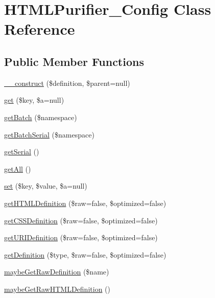 \hypertarget{classHTMLPurifier__Config}{\section{H\+T\+M\+L\+Purifier\+\_\+\+Config Class Reference}
\label{classHTMLPurifier__Config}
}
\subsection*{Public Member Functions}
\begin{DoxyCompactItemize}
\item 
\hyperlink{classHTMLPurifier__Config_aa44fad3c8858c98b59c1051bb9d3481a}{\+\_\+\+\_\+construct} (\$definition, \$parent=null)
\item 
\hyperlink{classHTMLPurifier__Config_ab94944fe3daf78d8acb100617073d0d7}{get} (\$key, \$a=null)
\item 
\hyperlink{classHTMLPurifier__Config_a5af7e5ab7e960f78f6fffb14c86cce9a}{get\+Batch} (\$namespace)
\item 
\hyperlink{classHTMLPurifier__Config_a48a81383e2d9a5f93e0c757204a70829}{get\+Batch\+Serial} (\$namespace)
\item 
\hyperlink{classHTMLPurifier__Config_af8bf913306ef7f975c0eb02686272f06}{get\+Serial} ()
\item 
\hyperlink{classHTMLPurifier__Config_af2654d806c22b83c1abebf1f6501a365}{get\+All} ()
\item 
\hyperlink{classHTMLPurifier__Config_a62dafd885e17cb0f0a3baf0bd9ad1681}{set} (\$key, \$value, \$a=null)
\item 
\hyperlink{classHTMLPurifier__Config_a79634932a0f13bf3b255c647cc87294f}{get\+H\+T\+M\+L\+Definition} (\$raw=false, \$optimized=false)
\item 
\hyperlink{classHTMLPurifier__Config_a788e57cc194d84dd3d627177ce600dfd}{get\+C\+S\+S\+Definition} (\$raw=false, \$optimized=false)
\item 
\hyperlink{classHTMLPurifier__Config_a4073764baa30ed93009c20b05253b5d6}{get\+U\+R\+I\+Definition} (\$raw=false, \$optimized=false)
\item 
\hyperlink{classHTMLPurifier__Config_af77400c39daefd9b9dd2be49aa60e48f}{get\+Definition} (\$type, \$raw=false, \$optimized=false)
\item 
\hyperlink{classHTMLPurifier__Config_a9891ef3146aa080560a8502b6372a2b5}{maybe\+Get\+Raw\+Definition} (\$name)
\item 
\hyperlink{classHTMLPurifier__Config_ac59e34fcfc4cfdc0176939e16b9b57fc}{maybe\+Get\+Raw\+H\+T\+M\+L\+Definition} ()

\end{DoxyCompactItemize}
